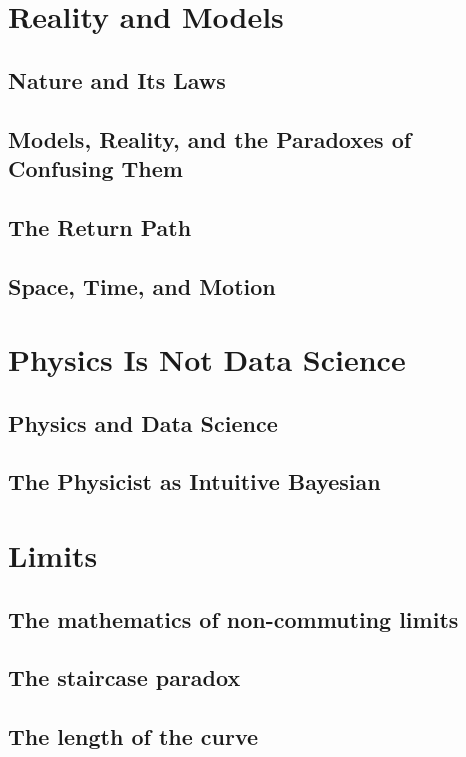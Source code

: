 \chapter{Reality and Models}
\label{rm}
\section{Nature and Its Laws}
\label{rm:nl}
\section{Models, Reality, and the Paradoxes of Confusing Them}
\label{rm:pc}
\section{The Return Path}
\label{rm:rp}
\section{Space, Time, and Motion}
\label{rm:stm}

\chapter{Physics Is Not Data Science}
\label{pd}
\section{Physics and Data Science}
\label{pd:pds}
\section{The Physicist as Intuitive Bayesian}
\label{pd:pib}

\chapter{Limits }
\label{lm}
\section{The mathematics of non-commuting limits}
\label{lm:ncl}
\section{The staircase paradox}
\label{lm:stp}
\section{The length of the curve}
\label{lm:cl}
